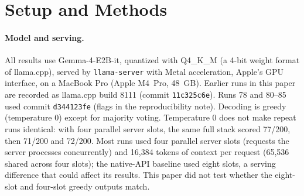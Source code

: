 \documentclass[11pt]{article}
\begin{document}
\section{Setup and Methods}
\label{sec:setup}

\paragraph{Model and serving.} All results use Gemma-4-E2B-it, quantized with Q4\_K\_M (a 4-bit weight format of llama.cpp), served by \texttt{llama-server} with Metal acceleration, Apple's GPU interface, on a MacBook Pro (Apple M4~Pro, 48~GB). Earlier runs in this paper are recorded as llama.cpp build 8111 (commit \texttt{11c325c6e}). Runs 78 and 80--85 used commit \texttt{d344123fe} (flags in the reproducibility note). Decoding is greedy (temperature 0) except for majority voting. Temperature 0 does not make repeat runs identical: with four parallel server slots, the same full stack scored 77/200, then 71/200 and 72/200. Most runs used four parallel server slots (requests the server processes concurrently) and 16{,}384 tokens of context per request (65{,}536 shared across four slots); the native-API baseline used eight slots, a serving difference that could affect its results. This paper did not test whether the eight-slot and four-slot greedy outputs match.
\end{document}
